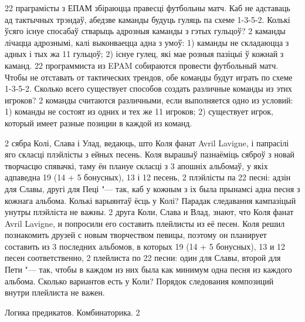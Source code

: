 \begin{problemList}
\bigskip

\problemItemSimple
{22 праграмісты з ЕПАМ збіраюцца правесці футбольны матч.
Каб не адставаць ад тактычных трэндаў, абедзве каманды будуць гуляць па схеме 1-3-5-2.
Колькі ўсяго існуе спосабаў стварыць адрозныя каманды з гэтых гульцоў?
2 каманды лічацца адрознымі, калі выконваецца адна з умоў:
1) каманды не складаюцца з адных і тых жа 11 гульцоў;
2) існуе гулец, які мае розныя пазіцыі ў кожнай з каманд.}
{22 программиста из EPAM собираются провести футбольный матч.
Чтобы не отставать от тактических трендов, обе команды будут играть по схеме 1-3-5-2.
Сколько всего существует способов создать различные команды из этих игроков?
2 команды считаются различными, если выполняется одно из условий:
1) команды не состоят из одних и тех же 11 игроков;
2) существует игрок, который имеет разные позиции в каждой из команд.}

\bigskip

\problemItemSimple
{2 сябра Колі, Слава і Улад, ведаюць, што Коля фанат Avril Lavigne, і папрасілі яго скласці плэйлісты з ейных песень.
Коля вырашыў пазнаёміць сяброў з новай творчасцю спявачкі, таму ён плануе скласці з 3 апошніх альбомаў,
у якіх адпаведна 19 (14 + 5 бонусных), 13 і 12 песень, 2 плэйлісты па 22 песні: адзін для Славы, другі для Пеці "--- так,
каб у кожным з іх была прынамсі адна песня з кожнага альбома.
Колькі варыянтаў ёсць у Колі? Парадак следавання кампазіцый унутры плэйліста не важны.}
{2 друга Коли, Слава и Влад, знают, что Коля фанат Avril Lavigne, и попросили его составить плейлисты из её песен.
Коля решил познакомить друзей с новым творчеством певицы, поэтому он планирует составить из 3 последних альбомов,
в которых 19 (14 + 5 бонусных), 13 и 12 песен соответственно, 2 плейлиста по 22 песни: один для Славы, второй для Пети "--- так,
чтобы в каждом из них была как минимум одна песня из каждого альбома.
Сколько вариантов есть у Коли? Порядок следования композиций внутри плейлиста не важен.}

\end{problemList}
    
\newpage 

{Логика предикатов. Комбинаторика.}
{2}

